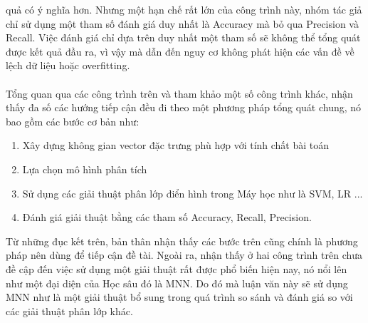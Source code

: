 quả có ý nghĩa hơn. Nhưng một hạn chế rất lớn của công trình này, nhóm tác giả 
chỉ sử dụng một tham số đánh giá duy nhất là Accuracy mà bỏ qua Precision và 
Recall. Việc đánh giá chỉ dựa trên duy nhất một tham số sẽ không thể tổng quát 
được kết quả đầu ra, vì vậy mà dẫn đến nguy cơ không phát hiện các vấn đề về 
lệch dữ liệu hoặc overfitting.\\\\ 
Tổng quan qua các công trình trên và tham khảo một số công trình khác, nhận thấy 
đa số các hướng tiếp cận đều đi theo một phương pháp tổng quát chung, nó bao gồm các bước 
cơ bản như:
\begin{enumerate}
\item Xây dựng không gian vector đặc trưng phù hợp với tính chất bài toán
\item Lựa chọn mô hình phân tích
\item Sử dụng các giải thuật phân lớp điển hình trong Máy học như là 
SVM, LR ...
\item Đánh giá giải thuật bằng các tham số Accuracy, Recall, Precision.
\end{enumerate}
Từ những đục kết trên, bản thân nhận thấy các bước trên cũng chính là phương pháp 
nên dùng để tiếp cận đề tài. Ngoài ra, nhận thấy ở hai công trình trên chưa đề 
cập đến việc sử dụng một giải thuật rất được phổ biến hiện nay, nó nổi lên như 
một đại diện của Học sâu đó là MNN. Do đó mà luận văn này sẽ sử dụng MNN như là 
một giải thuật bổ sung trong quá trình so sánh và đánh giá so với các giải thuật 
phân lớp khác.